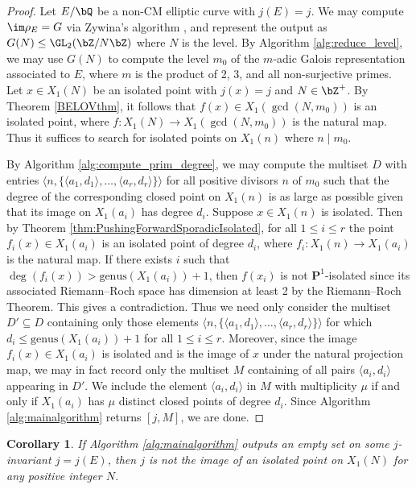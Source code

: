 \documentclass[11pt,reqno]{amsart}
\theoremstyle{plain}
\newtheorem{corollary}[theorem]{Corollary}
\theoremstyle{definition}
\newcommand{\Q}{\bQ}
\newcommand{\Z}{\bZ}
\newcommand{\PP}{\mathbf P}
\begin{document}
\begin{proof}
Let $E/\Q$ be a non-CM elliptic curve with $j(E)=j$. We may compute $\im \rho_E=G$ via Zywina's algorithm \cite{ZywinaAlgorithm}, and represent the output as $G(N) \leq \GL_2(\Z/N\Z)$ where $N$ is the level. By Algorithm \ref{alg:reduce_level}, we may use $G(N)$ to compute the level $m_0$ of the $m$-adic Galois representation associated to $E$, where $m$ is the product of 2, 3, and all non-surjective primes. Let $x\in X_1(N)$ be an isolated point with $j(x)=j$ and $N\in \Z^+$. By Theorem \ref{BELOVthm}, it follows that $f(x)\in X_1(\gcd(N,m_0))$ is an isolated point, where $f\colon X_1(N) \rightarrow X_1(\gcd(N,m_0))$ is the natural map. Thus it suffices to search for isolated points on $X_1(n)$ where $n \mid m_0$.

By Algorithm \ref{alg:compute_prim_degree}, we may compute the multiset $D$ with entries $\langle n, \{\langle a_1, d_1\rangle ,  \dots,  \langle a_r, d_r\rangle \} \rangle$ for all positive divisors $n$ of $m_0$ such that the degree of the corresponding closed point on $X_1(n)$ is as large as possible given that its image on $X_1(a_i) $ has degree $d_i$. Suppose $x \in X_1(n)$ is isolated. Then by Theorem \ref{thm:PushingForwardSporadicIsolated}, for all $1\leq i \leq r$ the point $f_i(x) \in X_1(a_i)$ is an isolated point of degree $d_i$, where $f_i: X_1(n) \rightarrow X_1(a_i)$ is the natural map. If there exists $i$ such that $\deg(f_i(x))>\text{genus}(X_1(a_i))+1$, then $f(x_i)$ is not $\PP^1$-isolated since its associated Riemann--Roch space has dimension at least 2 by the Riemann--Roch Theorem. This gives a contradiction. Thus we need only consider the multiset $D' \subseteq D$ containing only those elements $\langle n, \{\langle a_1, d_1\rangle ,  \dots,  \langle a_r, d_r\rangle \} \rangle$ for which $d_i \leq \text{genus}(X_1(a_i))+1$ for all $1 \leq i \leq r$. Moreover, since the image $f_i(x) \in X_1(a_i)$ is isolated and is the image of $x$ under the natural projection map, we may in fact record only the multiset $M$ containing of all pairs $\langle a_i,d_i\rangle $ appearing in $D'$. We include the element $\langle a_i,d_i\rangle $ in $M$ with multiplicity $\mu$ if and only if $X_1(a_i)$ has $\mu$ distinct closed points of degree $d_i$. Since Algorithm \ref{alg:mainalgorithm} returns $[j,M]$, we are done.
\end{proof}



\begin{corollary}\label{cor:P1_isolated}
If Algorithm \ref{alg:mainalgorithm} outputs an empty set on some $j$-invariant $j = j(E)$, then $j$ is not the image of an  isolated point on $X_1(N)$ for any positive integer $N$. 
\end{corollary}
\end{document}
